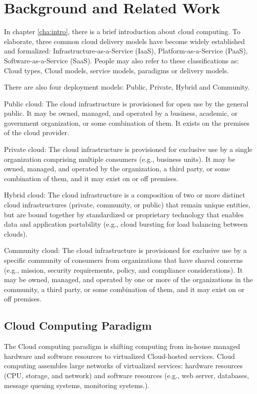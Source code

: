 \chapter{Background and Related Work}
\label{cha:background}
In chapter \ref{cha:intro}, there is a brief introduction about cloud computing.
To elaborate, three common cloud delivery models have become widely established and formalized:
Infrastructure-as-a-Service (IaaS), Platform-as-a-Service (PaaS), Software-as-a-Service (SaaS).
People may also refer to these classifications as: Cloud types, Cloud models, service models,
paradigms or delivery models.

There are also four deployment models\cite{CloudModel}: Public, Private, Hybrid and Community.

Public cloud: The cloud infrastructure is provisioned for open use by the general public. It may be owned, managed, and operated by a business, academic, or government organization, or some combination of them. It exists on the premises of the cloud provider. 

Private cloud: The cloud infrastructure is provisioned for exclusive use by a single organization comprising multiple consumers (e.g., business units). It may be owned, managed, and operated by the organization, a third party, or some combination of them, and it may exist on or off premises.  

Hybrid cloud: The cloud infrastructure is a composition of two or more distinct cloud infrastructures (private, community, or public) that remain unique entities, but are bound together by standardized or proprietary technology that enables data and application portability (e.g., cloud bursting for load balancing between clouds).

Community cloud: The cloud infrastructure is provisioned for exclusive use by a specific community of consumers from organizations that have shared concerns (e.g., mission, security requirements, policy, and compliance considerations). It may be owned, managed, and operated by one or more of the organizations in the community, a third party, or some combination of them, and it may exist on or off premises.


\section{Cloud Computing Paradigm}
The Cloud computing paradigm is shifting computing from in-house managed
hardware and software resources to virtualized Cloud-hosted
services. Cloud computing assembles large networks of
virtualized services: hardware resources (CPU, storage, and
network) and software resources (e.g., web server, databases,
message queuing systems, monitoring systems.). 

